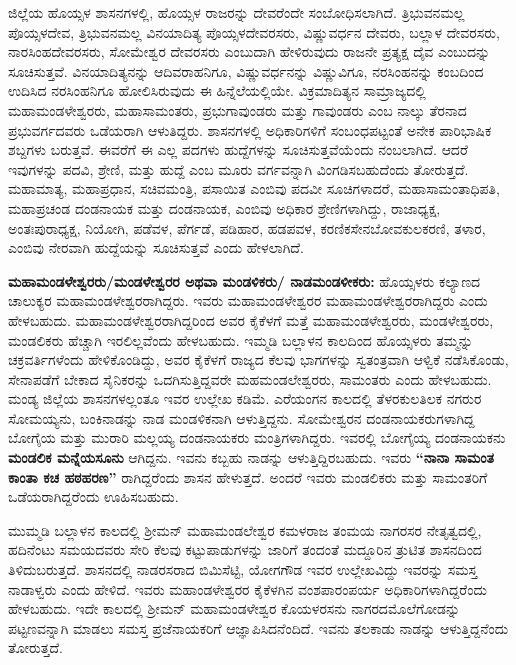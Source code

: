 ಜಿಲ್ಲೆಯ ಹೊಯ್ಸಳ ಶಾಸನಗಳಲ್ಲಿ, ಹೊಯ್ಸಳ ರಾಜರನ್ನು ದೇವರೆಂದೇ ಸಂಬೋಧಿಸಲಾಗಿದೆ. ತ್ರಿಭುವನಮಲ್ಲ ಪೊಯ್ಸಳದೇವ, ತ್ರಿಭುವನಮಲ್ಲ ವಿನಯಾದಿತ್ಯ ಪೊಯ್ಸಳದೇವರಸರು, ವಿಷ್ಣುವರ್ಧನ ದೇವರು, ಬಲ್ಲಾಳ ದೇವರಸರು, ನಾರಸಿಂಹದೇವರಸರು, ಸೋಮೇಶ್ವರ ದೇವರಸರು ಎಂಬುದಾಗಿ ಹೇಳಿರುವುದು ರಾಜನೇ ಪ್ರತ್ಯಕ್ಷ ದೈವ ಎಂಬುದನ್ನು ಸೂಚಿಸುತ್ತವೆ. ವಿನಯಾದಿತ್ಯನನ್ನು ಆದಿವರಾಹನಿಗೂ, ವಿಷ್ಣುವರ್ಧನನ್ನು ವಿಷ್ಣುವಿಗೂ, ನರಸಿಂಹನನ್ನು ಕಂಬದಿಂದ ಉದಿಸಿದ ನರಸಿಂಹನಿಗೂ ಹೋಲಿಸಿರುವುದು ಈ ಹಿನ್ನೆಲೆಯಲ್ಲಿಯೇ. ವಿಕ್ರಮಾದಿತ್ಯನ ಸಾಮ್ರಾಜ್ಯದಲ್ಲಿ ಮಹಾಮಂಡಳೇಶ್ವರರು, ಮಹಾಸಾಮಂತರು, ಪ್ರಭುಗಾವುಂಡರು ಮತ್ತು ಗಾವುಂಡರು ಎಂಬ ನಾಲ್ಕು ತೆರನಾದ ಪ್ರಭುವರ್ಗದವರು ಒಡೆಯರಾಗಿ ಆಳುತಿದ್ದರು. ಶಾಸನಗಳಲ್ಲಿ ಅಧಿಕಾರಿಗಳಿಗೆ ಸಂಬಂಧಪಟ್ಟಂತೆ ಅನೇಕ ಪಾರಿಭಾಷಿಕ ಶಬ್ದಗಳು ಬರುತ್ತವೆ. ಈವರೆಗೆ ಈ ಎಲ್ಲ ಪದಗಳು ಹುದ್ದೆಗಳನ್ನು ಸೂಚಿಸುತ್ತವೆಯೆಂದು ನಂಬಲಾಗಿದೆ. ಆದರೆ ಇವುಗಳನ್ನು ಪದವಿ, ಶ್ರೇಣಿ, ಮತ್ತು ಹುದ್ದೆ ಎಂಬ ಮೂರು ವರ್ಗವನ್ನಾಗಿ ವಿಂಗಡಿಸಬಹುದೆಂದು ತೋರುತ್ತದೆ. ಮಹಾಮಾತ್ಯ, ಮಹಾಪ್ರಧಾನ, ಸಚಿವ\enginline{-}ಮಂತ್ರಿ, ಪಸಾಯಿತ ಎಂಬಿವು ಪದವೀ ಸೂಚಿಗಳಾದರೆ, ಮಹಾಸಾಮಂತಾಧಿಪತಿ, ಮಹಾಪ್ರಚಂಡ ದಂಡನಾಯಕ ಮತ್ತು ದಂಡನಾಯಕ, ಎಂಬಿವು ಅಧಿಕಾರ ಶ್ರೇಣಿಗಳಾಗಿದ್ದು, ರಾಜಾಧ್ಯಕ್ಷ, ಅಂತಃಪುರಾಧ್ಯಕ್ಷ, ನಿಯೋಗಿ, ಪಡೆವಳ, ಪೆರ್ಗಡೆ, ಪಡಿಹಾರ, ಹಡಪವಳ, ಕರಣಿಕ\enginline{-}ಸೇನಬೋವ\enginline{-}ಕುಲಕರಣಿ, ತಳಾರ, ಎಂಬಿವು ನೇರವಾಗಿ ಹುದ್ದೆಯನ್ನು ಸೂಚಿಸುತ್ತವೆ ಎಂದು ಹೇಳಲಾಗಿದೆ.

\textbf{ಮಹಾಮಂಡಳೇಶ್ವರರು/ಮಂಡಳೇಶ್ವರರ ಅಥವಾ ಮಂಡಳಿಕರು/ ನಾಡಮಂಡಳೀಕರು:} ಹೊಯ್ಸಳರು ಕಲ್ಯಾಣದ ಚಾಲುಕ್ಯರ ಮಹಾಮಂಡಳೇಶ್ವರರಾಗಿದ್ದರು. ಇವರು ಮಹಾಮಂಡಳೇಶ್ವರರ ಮಹಾಮಂಡಳೇಶ್ವರರಾಗಿದ್ದರು ಎಂದು ಹೇಳಬಹುದು. ಮಹಾಮಂಡಳೇಶ್ವರರಾಗಿದ್ದರಿಂದ ಅವರ ಕೈಕೆಳಗೆ ಮತ್ತೆ ಮಹಾಮಂಡಳೇಶ್ವರರು, ಮಂಡಳೇಶ್ವರರು, ಮಂಡಲಿಕರು ಹೆಚ್ಚಾಗಿ ಇರಲಿಲ್ಲವೆಂದು ಹೇಳಬಹುದು. ಇಮ್ಮಡಿ ಬಲ್ಲಾಳನ ಕಾಲದಿಂದ ಹೊಯ್ಸಳರು ತಮ್ಮನ್ನು ಚಕ್ರವರ್ತಿ\-ಗಳೆಂದು ಹೇಳಿಕೊಂಡಿದ್ದು, ಅವರ ಕೈಕೆಳಗೆ ರಾಜ್ಯದ ಕೆಲವು ಭಾಗಗಳನ್ನು ಸ್ವತಂತ್ರವಾಗಿ ಆಳ್ವಿಕೆ ನಡೆಸಿಕೊಂಡು, ಸೇನಾಪಡೆಗೆ ಬೇಕಾದ ಸೈನಿಕರನ್ನು ಒದಗಿಸುತ್ತಿದ್ದವರೇ ಮಹಮಂಡಲೇಶ್ವರರು, ಸಾಮಂತರು ಎಂದು ಹೇಳಬಹುದು. ಮಂಡ್ಯ ಜಿಲ್ಲೆಯ ಶಾಸನಗಳಲ್ಲಂತೂ ಇವರ ಉಲ್ಲೇಖ ಕಡಿಮೆ. ಎರೆಯಂಗನ ಕಾಲದಲ್ಲಿ ತೆಳರಕುಲತಿಲಕ ನಗರುರ ಸೋಮಯ್ಯನು, ಬಂಕಿನಾಡನ್ನು ನಾಡ ಮಂಡಳಿಕನಾಗಿ ಆಳುತ್ತಿದ್ದನು. ಸೋಮೇಶ್ವರನ ದಂಡನಾಯಕರುಗಳಾಗಿದ್ದ ಬೋಗೈಯ ಮತ್ತು ಮುರಾರಿ ಮಲ್ಲಯ್ಯ ದಂಡನಾಯಕರು ಮಂತ್ರಿಗಳಾಗಿದ್ದರು. ಇವರಲ್ಲಿ ಬೋಗೈಯ್ಯ ದಂಡನಾಯಕನು \textbf{ಮಂಡಲಿಕ ಮನ್ನೆಯಸೂನು} ಆಗಿದ್ದನು. ಇವನು ಕಬ್ಬಹು ನಾಡನ್ನು ಆಳುತ್ತಿದ್ದಿರಬಹುದು. ಇವರು \textbf{“ನಾನಾ ಸಾಮಂತ ಕಾಂತಾ ಕಚ ಹಠಹರಣ”} ರಾಗಿದ್ದರೆಂದು ಶಾಸನ ಹೇಳುತ್ತದೆ. ಅಂದರೆ ಇವರು ಮಂಡಲಿಕರು ಮತ್ತು ಸಾಮಂತರಿಗೆ ಒಡೆಯರಾಗಿದ್ದರೆಂದು ಊಹಿಸಬಹುದು.

ಮುಮ್ಮಡಿ ಬಲ್ಲಾಳನ ಕಾಲದಲ್ಲಿ ಶ‍್ರೀಮನ್​ ಮಹಾಮಂಡಲೇಶ್ವರ ಕಮಳರಾಜ ತಂಮಯ ನಾಗರಸರ ನೇತೃತ್ವದಲ್ಲಿ, ಹದಿನೆಂಟು ಸಮಯದವರು ಸೇರಿ ಕೆಲವು ಕಟ್ಟುಪಾಡುಗಳನ್ನು ಜಾರಿಗೆ ತಂದಂತೆ ಮದ್ದೂರಿನ ತ್ರುಟಿತ ಶಾಸನದಿಂದ ತಿಳಿದುಬರುತ್ತದೆ. ಶಾಸನದಲ್ಲಿ ನಾಡರಸರಾದ ಬಿಮಿಸೆಟ್ಟಿ, ಯೋಗಗೌಡ ಇವರ ಉಲ್ಲೇಖವಿದ್ದು ಇವರನ್ನು ಸಮಸ್ತ ನಾಡಾಳ್ವರು ಎಂದು ಹೇಳಿದೆ. ಇವರು ಮಹಾಂಡಳೇಶ್ವರರ ಕೈಕೆಳಗಿನ ವಂಶಪಾರಂಪರ್ಯ ಅಧಿಕಾರಿಗಳಾಗಿದ್ದರೆಂದು ಹೇಳಬಹುದು. ಇದೇ ಕಾಲದಲ್ಲಿ ಶ‍್ರೀಮನ್​ ಮಹಾಮಂಡಳೇಶ್ವರ ಕೊಯಳರಸನು ನಾಗರದಮೊಲೆಗೋಡನ್ನು ಪಟ್ಟಣವನ್ನಾಗಿ ಮಾಡಲು ಸಮಸ್ತ ಪ್ರಜೆನಾಯಕರಿಗೆ ಆಜ್ಞಾಪಿಸಿದನೆಂದಿದೆ. ಇವನು ತಲಕಾಡು ನಾಡನ್ನು ಆಳುತ್ತಿದ್ದನೆಂದು ತೋರುತ್ತದೆ.


